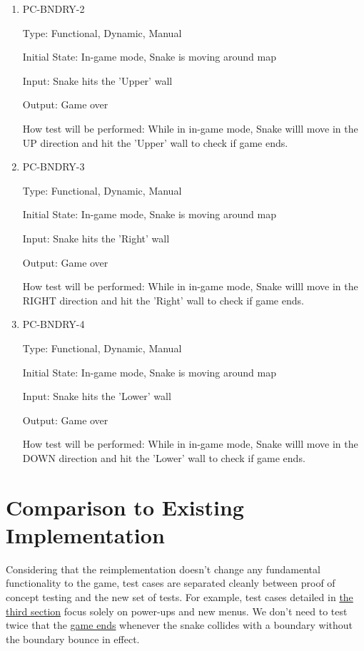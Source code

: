 \documentclass[12pt, titlepage]{article}
\begin{document}
\begin{enumerate}
\item{PC-BNDRY-2}
\label{pc-bndry-2}

Type: Functional, Dynamic, Manual

Initial State: In-game mode, Snake is moving around map

Input: Snake hits the 'Upper' wall

Output: Game over

How test will be performed: While in in-game mode, Snake willl move in the UP direction and hit the 'Upper' wall to check if game ends.

\item{PC-BNDRY-3}
\label{pc-bndry-3}

Type: Functional, Dynamic, Manual

Initial State: In-game mode, Snake is moving around map

Input: Snake hits the 'Right' wall

Output: Game over

How test will be performed: While in in-game mode, Snake willl move in the RIGHT direction and hit the 'Right' wall to check if game ends.

\item{PC-BNDRY-4}
\label{pc-bndry-4}

Type: Functional, Dynamic, Manual

Initial State: In-game mode, Snake is moving around map

Input: Snake hits the 'Lower' wall

Output: Game over

How test will be performed: While in in-game mode, Snake willl move in the DOWN direction and hit the 'Lower' wall to check if game ends.

\end{enumerate}

\section{Comparison to Existing Implementation}	
Considering that the reimplementation doesn't change any fundamental functionality to the game, test cases are separated cleanly between proof of concept testing and the new set of tests. For example, test cases detailed in \hyperref[se:STD]{the third section} focus solely on power-ups and new menus. We don't need to test twice that the \hyperref[gameover]{game ends} whenever the snake collides with a boundary without the boundary bounce in effect.
\end{document}
